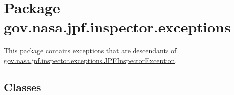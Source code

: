 \hypertarget{namespacegov_1_1nasa_1_1jpf_1_1inspector_1_1exceptions}{}\section{Package gov.\+nasa.\+jpf.\+inspector.\+exceptions}
\label{namespacegov_1_1nasa_1_1jpf_1_1inspector_1_1exceptions}


This package contains exceptions that are descendants of \hyperlink{classgov_1_1nasa_1_1jpf_1_1inspector_1_1exceptions_1_1_j_p_f_inspector_exception}{gov.\+nasa.\+jpf.\+inspector.\+exceptions.\+J\+P\+F\+Inspector\+Exception}.  


\subsection*{Classes}
